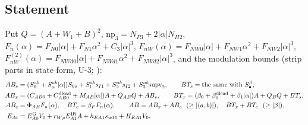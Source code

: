 \documentclass[11pt]{article}
\begin{document}
\subsection{Statement}\label{EI:sec:stmt}
Put $Q=(A+W_1+B)^2$, $\mathrm{np}_3=N_{P3}+2|\alpha|N_{H2}$, $F_n(\alpha)=F_{N0}|\alpha|+F_{N1}\alpha^2+C_3|\alpha|^3$, $F_{nW}(\alpha)=F_{NW0}|\alpha|+F_{NW1}\alpha^2+F_{NW2}|\alpha|^3$, $F^{(2)}_{nW}(\alpha)=F_{NWd0}|\alpha|+F_{NWd1}\alpha^2+F_{NWd2}|\alpha|^3$, and the modulation bounds (strip parts in state form, U-3; ):
\begin{align*}
AB_s&=(S^{ab}_0+S^{ab}_\alpha|\alpha|)S_{0s}+S^{ab}_1s_{I1}+S^{ab}_2s_{I2}+S^{ab}_3\mathrm{supv}_2,\qquad BT_s=\text{the same with }S^\beta_\bullet,\\
AB_x&=(C_{AB0}+C_{AB0}^{\rm dlead}+M_{AB}|\alpha|)A+Q_{AB}Q+AB_s,\qquad BT_x=(\beta_0+\beta_0^{\rm dlead}+\beta_1|\alpha|)A+Q_BQ+BT_s,\\
AB_c&=\Phi_{AB}F_n(\alpha),\quad BT_c=\beta_FF_n(\alpha),\qquad AB=AB_x+AB_c\ \ (\ge|(a,b)|),\quad BT_x+BT_c\ \ (\ge|\beta|),\\
E_{At}&=E_{A0}^{\rm G}V_0+r_{W\rho}E_{A1}^{\rm IR}A+h_{EA1}s_{w16}+H_{EA1}V_0 .
\end{align*}
\end{document}
